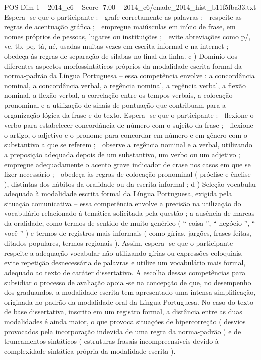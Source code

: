 \begin{textsample}{POS Dim 1 – 2014\_c6 – Score -7.00 – 2014\_c6/enade\_2014\_hist\_b11f5fba33.txt}
Espera -se que o participante :  grafe corretamente as palavras ;  respeite as regras de acentuação gráfica ;  empregue maiúsculas em início de frase, em nomes próprios de pessoas, lugares ou instituições ;  evite abreviações como p/, vc, tb, pq, tá, né, usadas muitas vezes em escrita informal e na internet ;  obedeça às regras de separação de sílabas no final da linha. c ) Domínio dos diferentes aspectos morfossintáticos próprios da modalidade escrita formal da norma-padrão da Língua Portuguesa – essa competência envolve : a concordância nominal, a concordância verbal, a regência nominal, a regência verbal, a flexão nominal, a flexão verbal, a correlação entre os tempos verbais, a colocação pronominal e a utilização de sinais de pontuação que contribuam para a organização lógica da frase e do texto.
Espera -se que o participante :  flexione o verbo para estabelecer concordância de número com o sujeito da frase ;  flexione o artigo, o adjetivo e o pronome para concordar em número e em gênero com o substantivo a que se referem ;  observe a regência nominal e a verbal, utilizando a preposição adequada depois de um substantivo, um verbo ou um adjetivo ;  empregue adequadamente o acento grave indicador de crase nos casos em que se fizer necessário ;  obedeça às regras de colocação pronominal ( próclise e ênclise ), distintas dos hábitos da oralidade ou da escrita informal ; d ) Seleção vocabular adequada à modalidade escrita formal da Língua Portuguesa, exigida pela situação comunicativa – essa competência envolve a precisão na utilização do vocabulário relacionado à temática solicitada pela questão ; a ausência de marcas da oralidade, como termos de sentido de muito genérico ( “ coisa ”, “ negócio ”, “ você ” ) e termos de registros mais informais ( como gírias, jargões, frases feitas, ditados populares, termos regionais ).
Assim, espera -se que o participante respeite a adequação vocabular não utilizando gírias ou expressões coloquiais, evite repetição desnecessária de palavras e utilize um vocabulário mais formal, adequado ao texto de caráter dissertativo.
A escolha dessas competências para subsidiar o processo de avaliação apoia -se na concepção de que, no desempenho dos graduandos, a modalidade escrita tem apresentado uma intensa simplificação, originada no padrão da modalidade oral da Língua Portuguesa.
No caso do texto de base dissertativa, inscrito em um registro formal, a distância entre as duas modalidades é ainda maior, o que provoca situações de hipercorreção ( desvios provocados pela incorporação indevida de uma regra da norma-padrão ) e de truncamentos sintáticos ( estruturas frasais incompreensíveis devido à complexidade sintática própria da modalidade escrita ).

\end{textsample}
